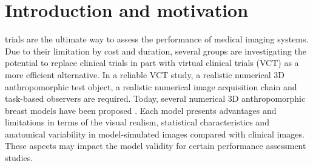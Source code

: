\documentclass[journal]{IEEEtran}
\begin{document}
%
\IEEEpeerreviewmaketitle

\section{Introduction and motivation}
\label{sec:intr-motiv}

%
%
%
%

 trials are the ultimate way to assess the
performance of medical imaging systems. Due to their limitation by
cost and duration, several groups are investigating the potential to
replace clinical trials in part with virtual clinical trials (VCT) as
a more efficient alternative. In a reliable VCT study, a realistic
numerical 3D anthropomorphic test object, a realistic numerical image
acquisition chain and task-based observers are required. Today,
several numerical 3D anthropomorphic breast models have been proposed
\cite{li2009methodology} \cite{mahr2012three} \cite{carton2014virtual}
\cite{bakic2014realistic} \cite{chen2015description}
\cite{graff2016new} \cite{elangovan2017design}
\cite{sturgeon2017synthetic}. Each model presents advantages and
limitations in terms of the visual realism, statistical
characteristics and anatomical variability in model-simulated images
compared with clinical images. These aspects may impact the model
validity for certain performance assessment studies.
\end{document}
